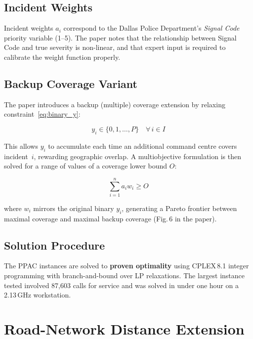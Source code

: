 \documentclass[12pt]{article}
\begin{document}
\subsection{Incident Weights}

Incident weights $a_i$ correspond to the Dallas Police Department's
\emph{Signal Code} priority variable (1--5).  The paper notes that the
relationship between Signal Code and true severity is non-linear, and that
expert input is required to calibrate the weight function properly.

\subsection{Backup Coverage Variant}

The paper introduces a backup (multiple) coverage extension by relaxing
constraint~\eqref{eq:binary_y}:

\begin{equation}
    y_i \in \{0,1,\ldots,P\} \quad \forall\, i \in I
    \label{eq:backup}
\end{equation}

This allows $y_i$ to accumulate each time an additional command centre covers
incident~$i$, rewarding geographic overlap.  A multiobjective formulation is
then solved for a range of values of a coverage lower bound $O$:

\begin{equation}
    \sum_{i=1}^{n} a_i w_i \ge O
    \label{eq:backup_constraint}
\end{equation}

where $w_i$ mirrors the original binary $y_i$, generating a Pareto frontier
between maximal coverage and maximal backup coverage (Fig.\,6 in the paper).

\subsection{Solution Procedure}

The PPAC instances are solved to \textbf{proven optimality} using CPLEX\,8.1
integer programming with branch-and-bound over LP relaxations.  The largest
instance tested involved 87,603 calls for service and was solved in under one
hour on a 2.13\,GHz workstation.

\section{Road-Network Distance Extension}
\end{document}
